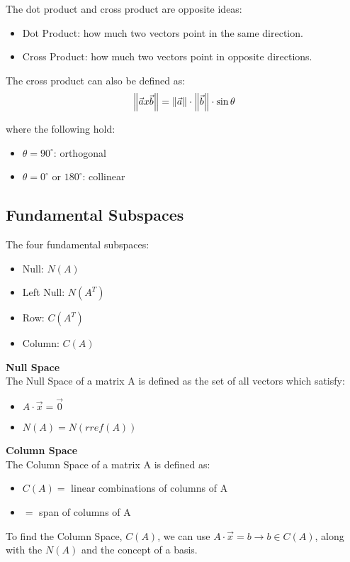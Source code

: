The dot product and cross product are opposite ideas:
\begin{itemize}
	\item Dot Product: how much two vectors point in the same direction.
	\item Cross Product: how much two vectors point in opposite directions.
\end{itemize}

The cross product can also be defined as:
\begin{equation}
	\left\Vert \vec{a} x \vec{b} \right\Vert = \left\Vert \vec{a} \right\Vert \cdot \left\Vert \vec{b} \right\Vert \cdot \sin \theta
\end{equation}

where the following hold:
\begin{itemize}
	\item $\theta = 90^\circ$: orthogonal
	\item $\theta = 0^\circ$ or $180^\circ$: collinear 
\end{itemize}


\subsection{Fundamental Subspaces}\label{concept2.7}
The four fundamental subspaces:
\begin{itemize}
	\item Null: $N(A)$
	\item Left Null: $N(A^T)$
	\item Row: $C(A^T)$
	\item Column: $C(A)$
\end{itemize}

\textbf{Null Space}
\\

The Null Space of a matrix A is defined as the set of all vectors which satisfy:
\begin{itemize}
	\item $A \cdot \vec{x} = \vec{0}$
	\item $N(A) = N(rref(A))$
\end{itemize}

\textbf{Column Space}
\\

The Column Space of a matrix A is defined as:
\begin{itemize}
	\item $C(A) =$ linear combinations of columns of A
	\item $=$ span of columns of A
\end{itemize}

To find the Column Space, $C(A)$, we can use $A \cdot \vec{x} = b \rightarrow b \in C(A)$, along with the $N(A)$ and the concept of a basis.
\\

